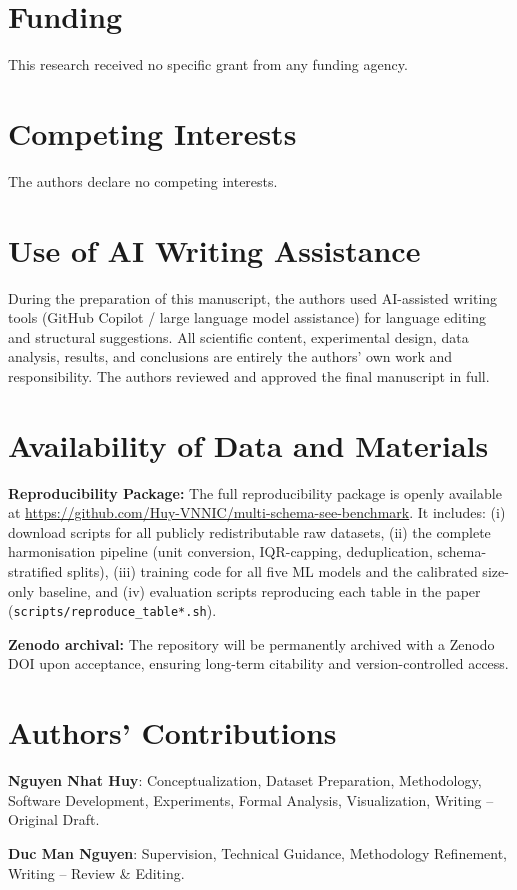 \documentclass{ieeeaccess}
\begin{document}
\section*{Funding}
This research received no specific grant from any funding agency.

\section*{Competing Interests}
The authors declare no competing interests.

\section*{Use of AI Writing Assistance}
During the preparation of this manuscript, the authors used AI-assisted writing tools (GitHub Copilot / large language model assistance) for language editing and structural suggestions. All scientific content, experimental design, data analysis, results, and conclusions are entirely the authors' own work and responsibility. The authors reviewed and approved the final manuscript in full.

\section*{Availability of Data and Materials}
\textbf{Reproducibility Package:} The full reproducibility package is openly available at
\url{https://github.com/Huy-VNNIC/multi-schema-see-benchmark}. It includes: (i) download scripts
for all publicly redistributable raw datasets, (ii) the complete harmonisation pipeline
(unit conversion, IQR-capping, deduplication, schema-stratified splits),
(iii) training code for all five ML models and the calibrated size-only baseline, and
(iv) evaluation scripts reproducing each table in the paper (\texttt{scripts/reproduce\_table*.sh}).

\textbf{Zenodo archival:} The repository will be permanently archived with a Zenodo DOI upon
acceptance, ensuring long-term citability and version-controlled access.

\section*{Authors' Contributions}
\textbf{Nguyen Nhat Huy}: Conceptualization, Dataset Preparation, Methodology, Software Development, 
Experiments, Formal Analysis, Visualization, Writing -- Original Draft.

\textbf{Duc Man Nguyen}: Supervision, Technical Guidance, Methodology Refinement,
Writing -- Review \& Editing.
\end{document}
